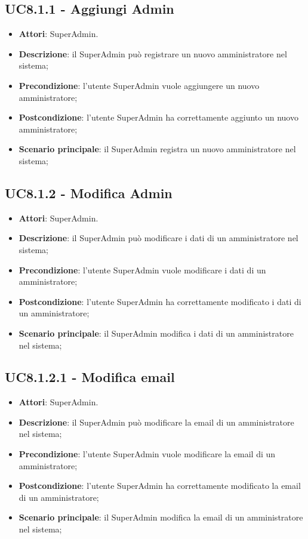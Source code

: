 \documentclass[../AnalisiDeiRequisiti_v4.0.0.tex]{subfiles}
\begin{document}
\subsection{UC8.1.1 - Aggiungi Admin} 
\label{sssec:UC8.1.1} 
\begin{itemize} 
\item \textbf{Attori}: SuperAdmin.
\item \textbf{Descrizione}: il SuperAdmin può registrare un nuovo amministratore nel sistema;
\item \textbf{Precondizione}: l'utente SuperAdmin vuole aggiungere un nuovo amministratore;
\item \textbf{Postcondizione}: l'utente SuperAdmin ha correttamente  aggiunto un nuovo amministratore;
\item \textbf{Scenario principale}: il SuperAdmin registra un nuovo amministratore nel sistema;
\end{itemize} 
\subsection{UC8.1.2 - Modifica Admin} 
\label{sssec:UC8.1.2} 
\begin{itemize} 
\item \textbf{Attori}: SuperAdmin.
\item \textbf{Descrizione}: il SuperAdmin può modificare i dati di un amministratore nel sistema;
\item \textbf{Precondizione}: l'utente SuperAdmin vuole modificare i dati di un amministratore;
\item \textbf{Postcondizione}: l'utente SuperAdmin ha correttamente  modificato i dati di un amministratore;
\item \textbf{Scenario principale}: il SuperAdmin modifica i dati di un amministratore nel sistema;
\end{itemize} 
\subsection{UC8.1.2.1 - Modifica email} 
\label{sssec:UC8.1.2.1} 
\begin{itemize} 
\item \textbf{Attori}: SuperAdmin.
\item \textbf{Descrizione}: il SuperAdmin può modificare la email di un amministratore nel sistema;
\item \textbf{Precondizione}: l'utente SuperAdmin vuole modificare la email di un amministratore;
\item \textbf{Postcondizione}: l'utente SuperAdmin ha correttamente  modificato la email di un amministratore;
\item \textbf{Scenario principale}: il SuperAdmin modifica la email di un amministratore nel sistema;
\end{itemize} 
\end{document}
